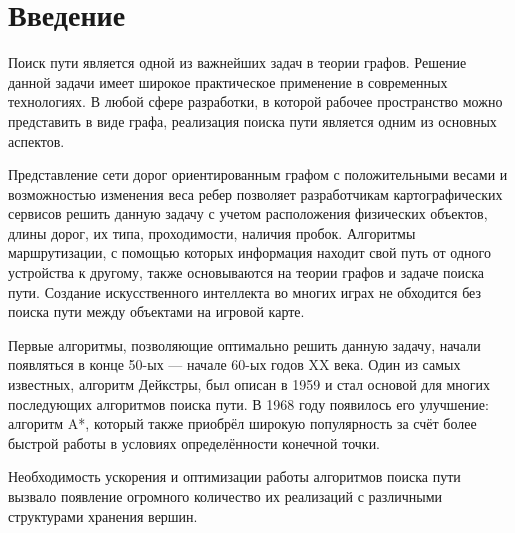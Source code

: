 \section{Введение}
Поиск пути является одной из важнейших задач в теории графов. Решение данной задачи имеет широкое практическое применение в современных технологиях. В любой сфере разработки, в которой рабочее пространство можно представить в виде графа, реализация поиска пути является одним из основных аспектов.

Представление сети дорог ориентированным графом с положительными весами и возможностью изменения веса ребер позволяет разработчикам картографических сервисов решить данную задачу с учетом расположения физических объектов, длины дорог, их типа, проходимости, наличия пробок. Алгоритмы маршрутизации, с помощью которых информация находит свой путь от одного устройства к другому, также основываются на теории графов и задаче поиска пути. Создание искусственного интеллекта во многих играх не обходится без поиска пути между объектами на игровой карте.

Первые алгоритмы, позволяющие оптимально решить данную задачу, начали появляться в конце 50-ых — начале 60-ых годов XX века. Один из самых известных, алгоритм Дейкстры, был описан в 1959 и стал основой для многих последующих алгоритмов поиска пути. В 1968 году появилось его улучшение: алгоритм A*, который также приобрёл широкую популярность за счёт более быстрой работы в условиях определённости конечной точки.

Необходимость ускорения и оптимизации работы алгоритмов поиска пути вызвало появление огромного количество их реализаций с различными структурами хранения вершин.
